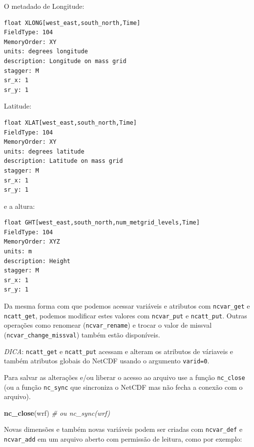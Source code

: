 \documentclass[]{book}
\newenvironment{Shaded}{\begin{snugshade}}{\end{snugshade}}
\newcommand{\KeywordTok}[1]{\textcolor[rgb]{0.13,0.29,0.53}{\textbf{#1}}}
\newcommand{\CommentTok}[1]{\textcolor[rgb]{0.56,0.35,0.01}{\textit{#1}}}
\newcommand{\NormalTok}[1]{#1}
\theoremstyle{definition}
\theoremstyle{definition}
\theoremstyle{definition}
\theoremstyle{remark}
\begin{document}
O metadado de Longitude:

\begin{verbatim}
float XLONG[west_east,south_north,Time]   
FieldType: 104
MemoryOrder: XY 
units: degrees longitude
description: Longitude on mass grid
stagger: M
sr_x: 1
sr_y: 1
\end{verbatim}

Latitude:

\begin{verbatim}
float XLAT[west_east,south_north,Time]   
FieldType: 104
MemoryOrder: XY 
units: degrees latitude
description: Latitude on mass grid
stagger: M
sr_x: 1
sr_y: 1
\end{verbatim}

e a altura:

\begin{verbatim}
float GHT[west_east,south_north,num_metgrid_levels,Time]   
FieldType: 104
MemoryOrder: XYZ
units: m
description: Height
stagger: M
sr_x: 1
sr_y: 1
\end{verbatim}

Da mesma forma com que podemos acessar variáveis e atributos com
\texttt{ncvar\_get} e \texttt{ncatt\_get}, podemos modificar estes
valores com \texttt{ncvar\_put} e \texttt{ncatt\_put}. Outras operações
como renomear (\texttt{ncvar\_rename}) e trocar o valor de missval
(\texttt{ncvar\_change\_missval}) também estão disponíveis.

\emph{DICA}: \texttt{ncatt\_get} e \texttt{ncatt\_put} acessam e alteram
os atributos de váriaveis e também atributos globais do NetCDF usando o
argumento \texttt{varid=0}.

Para salvar as alterações e/ou liberar o acesso ao arquivo use a função
\texttt{nc\_close} (ou a função \texttt{nc\_sync} que sincroniza o
NetCDF mas não fecha a conexão com o arquivo).

\begin{Shaded}
\begin{Highlighting}[]
\KeywordTok{nc_close}\NormalTok{(wrf) }\CommentTok{# ou nc_sync(wrf)}
\end{Highlighting}
\end{Shaded}

Novas dimensões e também novas variáveis podem ser criadas com
\texttt{ncvar\_def} e \texttt{ncvar\_add} em um arquivo aberto com
permissão de leitura, como por exemplo:
\end{document}
